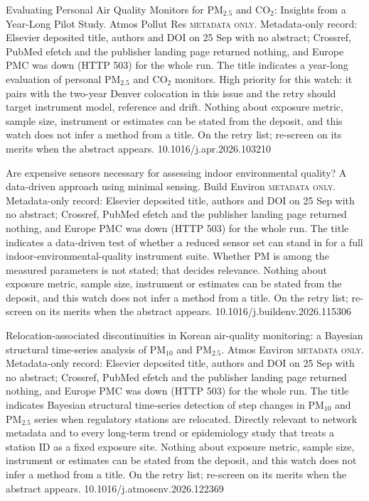 \documentclass[10pt]{article}
\begin{document}
{Evaluating Personal Air Quality Monitors for PM$_{2.5}$ and CO$_2$: Insights from a Year-Long Pilot Study.}
{Atmos Pollut Res}
{\textsc{metadata only.} Metadata-only record: Elsevier deposited title, authors and DOI on 25 Sep with no abstract; Crossref, PubMed efetch and the publisher landing page returned nothing, and Europe PMC was down (HTTP 503) for the whole run. The title indicates a year-long evaluation of personal PM$_{2.5}$ and CO$_2$ monitors. High priority for this watch: it pairs with the two-year Denver colocation in this issue and the retry should target instrument model, reference and drift. Nothing about exposure metric, sample size, instrument or estimates can be stated from the deposit, and this watch does not infer a method from a title. On the retry list; re-screen on its merits when the abstract appears.}
{10.1016/j.apr.2026.103210}

{Are expensive sensors necessary for assessing indoor environmental quality? A data-driven approach using minimal sensing.}
{Build Environ}
{\textsc{metadata only.} Metadata-only record: Elsevier deposited title, authors and DOI on 25 Sep with no abstract; Crossref, PubMed efetch and the publisher landing page returned nothing, and Europe PMC was down (HTTP 503) for the whole run. The title indicates a data-driven test of whether a reduced sensor set can stand in for a full indoor-environmental-quality instrument suite. Whether PM is among the measured parameters is not stated; that decides relevance. Nothing about exposure metric, sample size, instrument or estimates can be stated from the deposit, and this watch does not infer a method from a title. On the retry list; re-screen on its merits when the abstract appears.}
{10.1016/j.buildenv.2026.115306}

{Relocation-associated discontinuities in Korean air-quality monitoring: a Bayesian structural time-series analysis of PM$_{10}$ and PM$_{2.5}$.}
{Atmos Environ}
{\textsc{metadata only.} Metadata-only record: Elsevier deposited title, authors and DOI on 25 Sep with no abstract; Crossref, PubMed efetch and the publisher landing page returned nothing, and Europe PMC was down (HTTP 503) for the whole run. The title indicates Bayesian structural time-series detection of step changes in PM$_{10}$ and PM$_{2.5}$ series when regulatory stations are relocated. Directly relevant to network metadata and to every long-term trend or epidemiology study that treats a station ID as a fixed exposure site. Nothing about exposure metric, sample size, instrument or estimates can be stated from the deposit, and this watch does not infer a method from a title. On the retry list; re-screen on its merits when the abstract appears.}
{10.1016/j.atmosenv.2026.122369}
\end{document}
